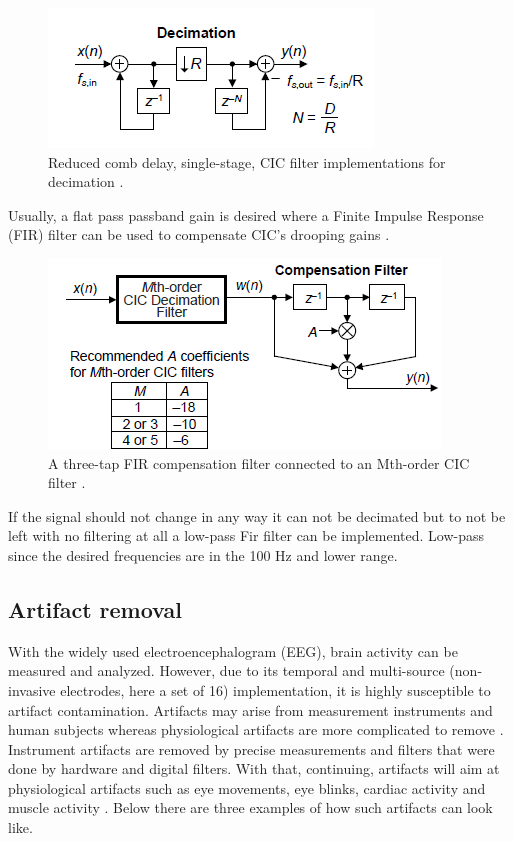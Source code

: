 \begin{figure}[H]
    \centering
\includegraphics[width=0.35\textheight]{images/cic.png}
    \caption{Reduced comb delay, single-stage, CIC filter implementations for decimation \cite{CICguide}.}
    \label{fig:cic}
\end{figure}

Usually, a flat pass passband gain is desired where a Finite Impulse Response (FIR) filter can be used to compensate CIC's drooping gains \cite{CICguide}.

\begin{figure}[H]
    \centering
\includegraphics[width=0.35\textheight]{images/compFIR.png}
    \caption{A three-tap FIR compensation filter connected to an Mth-order CIC filter \cite{CICguide}.}
    \label{fig:cicfir}
\end{figure}

If the signal should not change in any way it can not be decimated but to not be left with no filtering at all a low-pass Fir filter can be implemented. Low-pass since the desired frequencies are in the 100 Hz and lower range.

\subsection{Artifact removal}
With the widely used electroencephalogram (EEG), brain activity can be measured and analyzed. However, due to its temporal and multi-source (non-invasive electrodes, here a set of 16) implementation, it is highly susceptible to artifact contamination. Artifacts may arise from measurement instruments and human subjects whereas physiological artifacts are more complicated to remove \cite{artifacts}. Instrument artifacts are removed by precise measurements and filters that were done by hardware and digital filters. With that, continuing, artifacts will aim at physiological artifacts such as eye movements, eye blinks, cardiac activity and muscle activity \cite{artifacts}. Below there are three examples of how such artifacts can look like.

